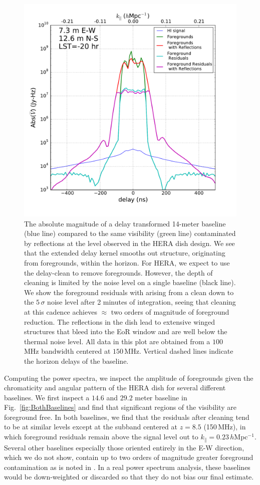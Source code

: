 \documentclass[twocolumn]{emulateapj}
\begin{document}
\begin{figure}
\includegraphics[width=.5\textwidth]{figures/cleaning_noise_Nithya.pdf}
\caption{The absolute magnitude of a delay transformed 14-meter baseline (blue line) compared to the same visibility (green line) contaminated by reflections at the level observed in the HERA dish design. We see that the extended delay kernel smooths out structure, originating from foregrounds, within the horizon. For HERA, we expect to use the delay-clean to remove foregrounds. However, the depth of cleaning is limited by the noise level on a single baseline (black line). We show the foreground residuals with arising from a clean down to the $5\,\sigma$ noise level after 2 minutes of integration, seeing that cleaning at this cadence achieves $\approx$ two orders of magnitude of foreground reduction. The reflections in the dish lead to extensive winged structures that bleed into the EoR window and are well below the thermal noise level. All data in this plot are obtained from a $100$\,MHz bandwidth centered at $150$\,MHz. Vertical dashed lines indicate the horizon delays of the baseline.}
\label{fig:Cleaning}
\end{figure}


Computing the power spectra, we inspect the amplitude of foregrounds given the chromaticity and angular pattern of the HERA dish for several different baselines. We first inspect a $14.6$ and $29.2$ meter baseline in Fig.~\ref{fig:BothBaselines} and find that significant regions of the visibility are foreground free. In both baselines, we find that the residuals after cleaning tend to be at similar levels except at the subband centered at $z=8.5$ (150\,MHz), in which foreground residuals remain above the signal level out to $k_\parallel=0.23$\,$h$Mpc$^{-1}$. Several other baselines especially those oriented entirely in the E-W direction, which we do not show, contain up to two orders of magnitude greater foreground contamination as is noted in \citep{Thyagarajan:2015b}. In a real power spectrum analysis, these baselines would be down-weighted or discarded so that they do not bias our final estimate. 
\end{document}
